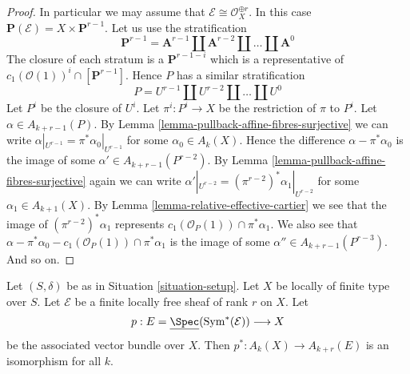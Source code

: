 \begin{proof}
\medskip\noindent
In particular we may assume that $\mathcal{E} \cong \mathcal{O}_X^{\oplus r}$.
In this case $\mathbf{P}(\mathcal{E}) = X \times \mathbf{P}^{r - 1}$.
Let us use the stratification
$$
\mathbf{P}^{r - 1} = \mathbf{A}^{r - 1}
\coprod \mathbf{A}^{r - 2}
\coprod \ldots
\coprod \mathbf{A}^0
$$
The closure of each stratum is a $\mathbf{P}^{r - 1 - i}$ which is a
representative of $c_1(\mathcal{O}(1))^i \cap [\mathbf{P}^{r - 1}]$.
Hence $P$ has a similar stratification
$$
P = U^{r - 1} \coprod U^{r - 2} \coprod \ldots \coprod U^0
$$
Let $P^i$ be the closure of $U^i$. Let $\pi^i : P^i \to X$
be the restriction of $\pi$ to $P^i$.
Let $\alpha \in A_{k + r - 1}(P)$. By
Lemma \ref{lemma-pullback-affine-fibres-surjective}
we can write $\alpha|_{U^{r - 1}} = \pi^*\alpha_0|_{U^{r - 1}}$
for some $\alpha_0 \in A_k(X)$. Hence the difference
$\alpha - \pi^*\alpha_0$ is the image of some
$\alpha' \in A_{k + r - 1}(P^{r - 2})$.
By Lemma \ref{lemma-pullback-affine-fibres-surjective}
again we can write
$\alpha'|_{U^{r - 2}} = (\pi^{r - 2})^*\alpha_1|_{U^{r - 2}}$
for some $\alpha_1 \in A_{k + 1}(X)$.
By Lemma \ref{lemma-relative-effective-cartier}
we see that the image of $(\pi^{r - 2})^*\alpha_1$
represents $c_1(\mathcal{O}_P(1)) \cap \pi^*\alpha_1$.
We also see that
$\alpha - \pi^*\alpha_0 - c_1(\mathcal{O}_P(1)) \cap \pi^*\alpha_1$
is the image of some $\alpha'' \in A_{k + r - 1}(P^{r - 3})$.
And so on.
\end{proof}

\begin{lemma}
\label{lemma-vectorbundle}
Let $(S, \delta)$ be as in Situation \ref{situation-setup}.
Let $X$ be locally of finite type over $S$.
Let $\mathcal{E}$ be a finite locally free sheaf of rank $r$ on $X$.
Let
$$
p :
E = \underline{\Spec}(\text{Sym}^*(\mathcal{E}))
\longrightarrow
X
$$
be the associated vector bundle over $X$.
Then $p^* : A_k(X) \to A_{k + r}(E)$ is an isomorphism for all $k$.
\end{lemma}


